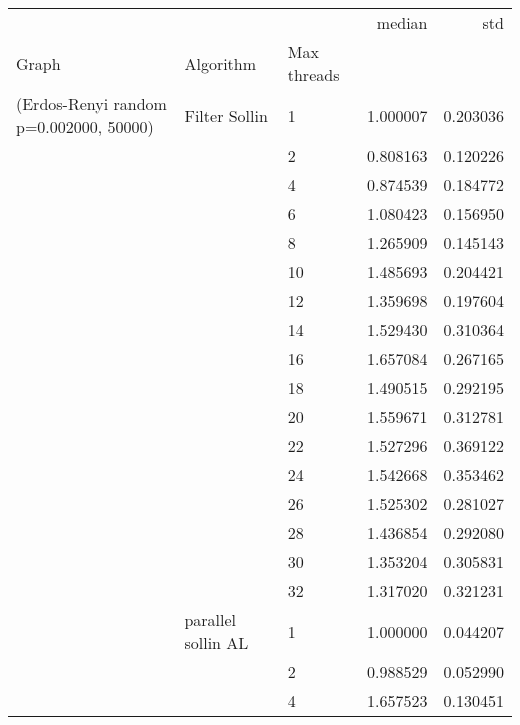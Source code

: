 \begin{tabular}{lllrr}
\toprule
                      &                     &    &    median &       std \\
Graph & Algorithm & Max threads &           &           \\
\midrule
(Erdos-Renyi random p=0.002000, 50000) & Filter Sollin & 1  &  1.000007 &  0.203036 \\
                      &                     & 2  &  0.808163 &  0.120226 \\
                      &                     & 4  &  0.874539 &  0.184772 \\
                      &                     & 6  &  1.080423 &  0.156950 \\
                      &                     & 8  &  1.265909 &  0.145143 \\
                      &                     & 10 &  1.485693 &  0.204421 \\
                      &                     & 12 &  1.359698 &  0.197604 \\
                      &                     & 14 &  1.529430 &  0.310364 \\
                      &                     & 16 &  1.657084 &  0.267165 \\
                      &                     & 18 &  1.490515 &  0.292195 \\
                      &                     & 20 &  1.559671 &  0.312781 \\
                      &                     & 22 &  1.527296 &  0.369122 \\
                      &                     & 24 &  1.542668 &  0.353462 \\
                      &                     & 26 &  1.525302 &  0.281027 \\
                      &                     & 28 &  1.436854 &  0.292080 \\
                      &                     & 30 &  1.353204 &  0.305831 \\
                      &                     & 32 &  1.317020 &  0.321231 \\
                      & parallel sollin AL & 1  &  1.000000 &  0.044207 \\
                      &                     & 2  &  0.988529 &  0.052990 \\
                      &                     & 4  &  1.657523 &  0.130451 \\

\end{tabular}
